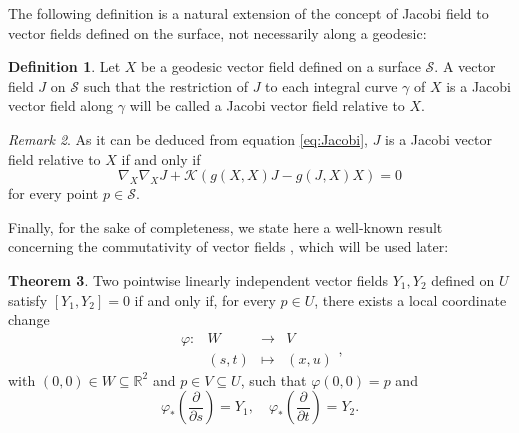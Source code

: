 \documentclass{article}
\theoremstyle{remark}
\newtheorem{remark}{Remark}[section]
\theoremstyle{definition}
\newtheorem{theorem}[remark]{Theorem}
\newtheorem{definition}[remark]{Definition}
\begin{document}

The following definition is a natural extension of the concept of Jacobi field to vector fields defined on the surface, not necessarily along a geodesic:
\begin{definition}\label{def:Jacobi}
Let $X$ be a geodesic vector field defined on a surface $\mathcal S$. A vector field $J$ on $\mathcal{S}$ such that the restriction of $J$ to each integral curve $\gamma$ of $X$ is a Jacobi vector field along $\gamma$ will be called a Jacobi vector field relative to $X$.
\end{definition}
\begin{remark}\label{rem:jacobi}
    As it can be deduced from equation \eqref{eq:Jacobi}, $J$ is a Jacobi vector field relative to $X$ if and only if
    \begin{equation}\label{eq:Jacobirel}
        \nabla_{X} \nabla_{X} J+\mathcal{K}\left( g(X,X)J-g(J,X)X\right)=0
        \end{equation}
for every point $p\in \mathcal S$. 
\end{remark}





Finally, for the sake of completeness, we state here a well-known result concerning the commutativity of vector fields \cite[Theorem 13.10]{lee2013smooth}, which will be used later:
\begin{theorem}\label{commutingvf}
Two pointwise linearly independent vector fields $Y_1,Y_2$ defined on $U$ satisfy $[Y_1,Y_2]=0$ if and only if, for every $p\in U$, there exists a local coordinate change
$$
\begin{array}{rccc}
\varphi:& W &\to & V\\
        & (s,t) & \mapsto &(x,u)
\end{array},
$$
with $(0,0) \in W\subseteq \mathbb R^2$ and $p\in V \subseteq U$, such that $\varphi(0,0)=p$ and 
$$
\varphi_*\left(\frac{\partial}{\partial s}\right) =Y_1,\quad \varphi_*\left(\dfrac{\partial}{\partial t}\right)=Y_2.
$$  
\end{theorem}
\end{document}
